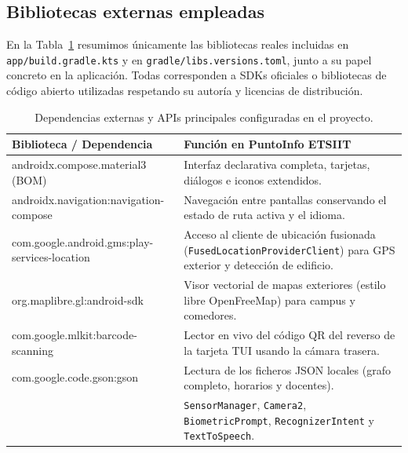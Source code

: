 \documentclass[11pt,a4paper]{article}
\begin{document}
\subsection{Bibliotecas externas empleadas}
En la Tabla~\ref{tab:dependencias} resumimos únicamente las bibliotecas reales incluidas en \texttt{app/build.gradle.kts} y en \texttt{gradle/libs.versions.toml}, junto a su papel concreto en la aplicación. Todas corresponden a SDKs oficiales o bibliotecas de código abierto utilizadas respetando su autoría y licencias de distribución.

\vspace{0.5cm}

\begin{table}[htbp]
\centering
\small
\renewcommand{\arraystretch}{1.22}
\begin{tabularx}{\textwidth}{>{\ttfamily\raggedright\arraybackslash}p{5.8cm} X}
\toprule
\normalfont\bfseries Biblioteca / Dependencia & \textbf{Función en PuntoInfo ETSIIT} \\
\midrule
androidx.compose.material3 (BOM) & Interfaz declarativa completa, tarjetas, diálogos e iconos extendidos. \\
androidx.navigation:\allowbreak navigation-compose & Navegación entre pantallas conservando el estado de ruta activa y el idioma. \\
com.google.android.gms:\allowbreak play-services-location & Acceso al cliente de ubicación fusionada (\texttt{FusedLocationProviderClient}) para GPS exterior y detección de edificio. \\
org.maplibre.gl:\allowbreak android-sdk & Visor vectorial de mapas exteriores (estilo libre OpenFreeMap) para campus y comedores. \\
com.google.mlkit:\allowbreak barcode-scanning & Lector en vivo del código QR del reverso de la tarjeta TUI usando la cámara trasera. \\
com.google.code.gson:gson & Lectura de los ficheros JSON locales (grafo completo, horarios y docentes). \\
{\normalfont APIs nativas del SDK Android} & \texttt{SensorManager}, \texttt{Camera2}, \texttt{BiometricPrompt}, \texttt{RecognizerIntent} y \texttt{TextToSpeech}. \\
\bottomrule
\end{tabularx}
\caption{Dependencias externas y APIs principales configuradas en el proyecto.}
\label{tab:dependencias}
\end{table}

\clearpage
\end{document}
